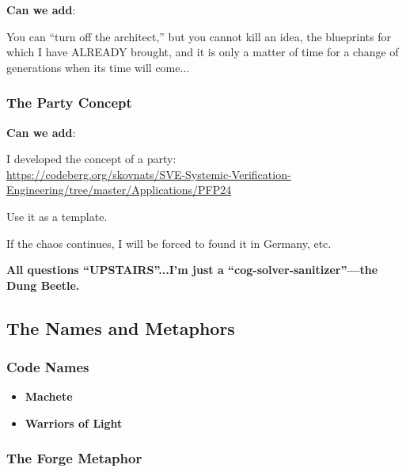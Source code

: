 \documentclass[11pt,a4paper]{article}
\theoremstyle{definition}
\theoremstyle{remark}
\begin{document}
\textbf{Can we add}:

You can ``turn off the architect,'' but you cannot kill an idea, the blueprints for which I have ALREADY brought, and it is only a matter of time for a change of generations when its time will come...

\subsubsection{The Party Concept}

\textbf{Can we add}:

I developed the concept of a party: \\
\url{https://codeberg.org/skovnats/SVE-Systemic-Verification-Engineering/tree/master/Applications/PFP24}

Use it as a template.

If the chaos continues, I will be forced to found it in Germany, etc.

\begin{center}
\end{center}

\textbf{All questions ``UPSTAIRS''...I'm just a ``cog-solver-sanitizer''—the Dung Beetle.}

\subsection{The Names and Metaphors}

\subsubsection{Code Names}

\begin{itemize}
\item \textbf{Machete}
\item \textbf{Warriors of Light}
\end{itemize}

\subsubsection{The Forge Metaphor}
\end{document}
